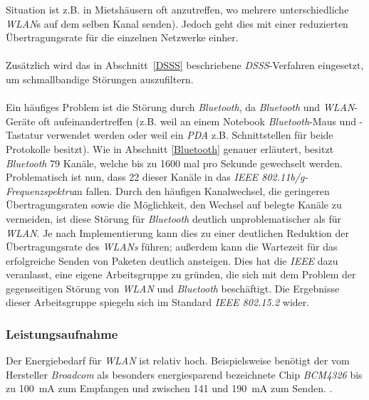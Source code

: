             Situation ist z.B. in Mietshäusern oft anzutreffen, wo mehrere 
            unterschiedliche \emph{WLAN}s auf dem selben Kanal senden). Jedoch geht dies
            mit einer reduzierten Übertragungsrate für die einzelnen Netzwerke
            einher.\\
            \\
            Zusätzlich wird das in Abschnitt~\ref{DSSS} beschriebene \emph{DSSS}-Verfahren
            eingesetzt, um schmallbandige Störungen auszufiltern. \\
            \\
            Ein häufiges Problem ist die Störung durch \emph{Bluetooth}, da 
            \emph{Bluetooth} und \emph{WLAN}-Geräte oft aufeinandertreffen (z.B. weil an einem
            Notebook \emph{Bluetooth}-Maus und -Tastatur verwendet werden oder weil 
            ein \emph{PDA} z.B. Schnittstellen für beide Protokolle besitzt).
            Wie in Abschnitt \ref{Bluetooth} genauer erläutert, besitzt \emph{Bluetooth}
            79 Kanäle, welche bis zu 1600 mal pro Sekunde gewechselt werden.
            Problematisch ist nun, dass 22 dieser Kanäle in das 
            \emph{IEEE 802.11b/g-Frequenzspektru}m fallen. Durch den häufigen
            Kanalwechsel, die geringeren Übertragungsraten sowie die 
            Möglichkeit, den Wechsel auf belegte Kanäle zu vermeiden, ist diese
            Störung für \emph{Bluetooth} deutlich unproblematischer als für \emph{WLAN}.
            Je nach Implementierung kann dies zu einer deutlichen Reduktion
            der Übertragungsrate des \emph{WLANs} führen; außerdem kann die Wartezeit
            für das erfolgreiche Senden von Paketen deutlich ansteigen.
            Dies hat die \emph{IEEE} dazu veranlasst, eine eigene Arbeitsgruppe
            zu gründen, die sich mit dem Problem der gegenseitigen Störung
            von \emph{WLAN} und \emph{Bluetooth} beschäftigt. Die Ergebnisse dieser
            Arbeitsgruppe spiegeln sich im Standard \emph{IEEE 802.15.2} wider.

        \subsubsection{Leistungsaufnahme}
            Der Energiebedarf für \emph{WLAN} ist relativ hoch. Beispielsweise benötigt der
            vom Hersteller \emph{Broadcom} als besonders energiesparend bezeichnete Chip
            \emph{BCM4326} bis zu 100~mA zum Empfangen und zwischen 141 und 190~mA zum Senden.
            \cite{BCM4326_Datasheet}. 

